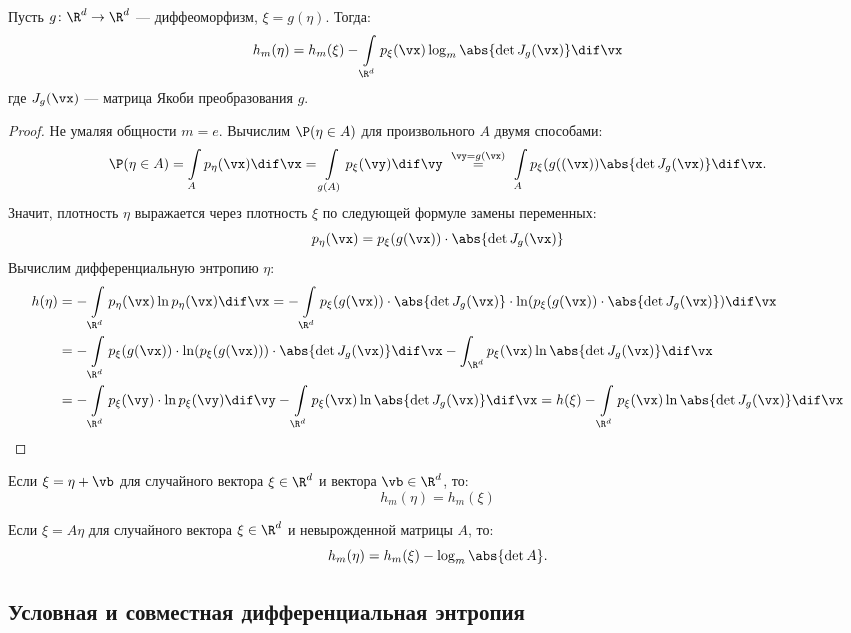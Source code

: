 \begin{proposition}
	Пусть $g \colon \R^d \to \R^d$ --- диффеоморфизм, $\xi = g(\eta)$. Тогда:
	\[
		h_m(\eta) = h_m(\xi) - \int\limits_{\R^d}p_{\xi}(\vx)\log_m\abs{\det J_g(\vx)}\dif\vx
	\]
	где $J_g(\vx)$ ---  матрица Якоби преобразования $g$.
\end{proposition}
\begin{proof}
	Не умаляя общности $m = e$. Вычислим $\P(\eta \in A)$ для произвольного $A$ двумя способами:
	\[
		\P(\eta \in A) = \int\limits_{A} p_{\eta}(\vx)\dif \vx = \int\limits_{g(A)} p_{\xi}(\vy)\dif\vy \ \overset{\vy = g(\vx)}{=}\  \int\limits_{A} p_{\xi}(g((\vx))\abs{\det J_g(\vx)} \dif\vx.
	\]
	Значит, плотность $\eta$ выражается через плотность $\xi$ по следующей формуле замены переменных:
	\[
		p_{\eta}(\vx) = p_{\xi}(g(\vx)) \cdot \abs{\det J_{g}(\vx)} 
	\]
	Вычислим дифференциальную энтропию $\eta$:
	\begin{align*}
		h(\eta) &= -\int\limits_{\R^d} p_{\eta}(\vx) \ln p_{\eta}(\vx) \dif \vx
				 = -\int\limits_{\R^d} p_{\xi}(g(\vx)) \cdot \abs{\det J_g(\vx)} \cdot \ln(p_{\xi}(g(\vx))\cdot \abs{\det J_g(\vx)})\dif\vx \\
				&= -\int\limits_{\R^d} p_{\xi}(g(\vx)) \cdot \ln(p_{\xi}(g(\vx))) \cdot \abs{\det J_g(\vx)}\dif\vx - \int_{\R^d}p_{\xi}(\vx)\ln \abs{\det J_g(\vx)}\dif\vx \\
				& = -\int\limits_{\R^d} p_{\xi}(\vy) \cdot \ln p_{\xi}(\vy) \dif\vy - \int\limits_{\R^d}p_{\xi}(\vx)\ln\abs{\det J_g(\vx)}\dif\vx
				  = h(\xi) - \int\limits_{\R^d}p_{\xi}(\vx)\ln\abs{\det J_g(\vx)}\dif\vx
	\end{align*}
\end{proof}
\begin{corollary}[Сдвиг]
	Если $\xi = \eta + \vb$ для случайного вектора $\xi \in \R^d$ и вектора $\vb \in \R^d$, то:
	\[
		h_m(\eta) = h_m(\xi) 
	\]
\end{corollary}
\begin{corollary}[Масштабирование]
	Если $\xi = A\eta$ для случайного вектора $\xi \in \R^d$ и невырожденной матрицы $A$, то:
	\[
		h_m(\eta) = h_m(\xi) - \log_m\abs{\det A}.
	\]
\end{corollary}

\subsection{Условная и совместная дифференциальная энтропия}

